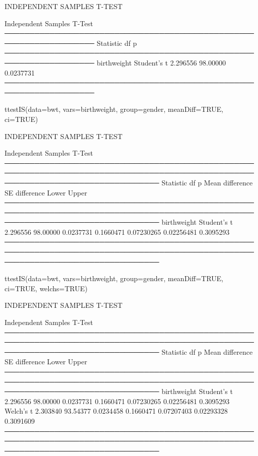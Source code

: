 \documentclass[
]{memoir}
\newenvironment{Shaded}{\begin{snugshade}}{\end{snugshade}}
\newcommand{\AttributeTok}[1]{\textcolor[rgb]{0.77,0.63,0.00}{#1}}
\newcommand{\ConstantTok}[1]{\textcolor[rgb]{0.00,0.00,0.00}{#1}}
\newcommand{\FunctionTok}[1]{\textcolor[rgb]{0.00,0.00,0.00}{#1}}
\newcommand{\NormalTok}[1]{#1}
\begin{document}
INDEPENDENT SAMPLES T-TEST

Independent Samples T-Test\\
────────────────────────────────────────────────────────────────────
Statistic df p\\
────────────────────────────────────────────────────────────────────
birthweight Student's t 2.296556 98.00000 0.0237731\\
────────────────────────────────────────────────────────────────────

\begin{Shaded}
\begin{Highlighting}[]
\FunctionTok{ttestIS}\NormalTok{(}\AttributeTok{data=}\NormalTok{bwt, }\AttributeTok{vars=}\NormalTok{birthweight, }\AttributeTok{group=}\NormalTok{gender, }\AttributeTok{meanDiff=}\ConstantTok{TRUE}\NormalTok{, }\AttributeTok{ci=}\ConstantTok{TRUE}\NormalTok{)}
\end{Highlighting}
\end{Shaded}

INDEPENDENT SAMPLES T-TEST

Independent Samples T-Test\\
───────────────────────────────────────────────────────────────────────────────────────────────────────────────────────────────────
Statistic df p Mean difference SE difference Lower Upper\\
───────────────────────────────────────────────────────────────────────────────────────────────────────────────────────────────────
birthweight Student's t 2.296556 98.00000 0.0237731 0.1660471 0.07230265 0.02256481 0.3095293\\
───────────────────────────────────────────────────────────────────────────────────────────────────────────────────────────────────

\begin{Shaded}
\begin{Highlighting}[]
\FunctionTok{ttestIS}\NormalTok{(}\AttributeTok{data=}\NormalTok{bwt, }\AttributeTok{vars=}\NormalTok{birthweight, }\AttributeTok{group=}\NormalTok{gender, }\AttributeTok{meanDiff=}\ConstantTok{TRUE}\NormalTok{, }\AttributeTok{ci=}\ConstantTok{TRUE}\NormalTok{, }\AttributeTok{welchs=}\ConstantTok{TRUE}\NormalTok{)}
\end{Highlighting}
\end{Shaded}

INDEPENDENT SAMPLES T-TEST

Independent Samples T-Test\\
───────────────────────────────────────────────────────────────────────────────────────────────────────────────────────────────────
Statistic df p Mean difference SE difference Lower Upper\\
───────────────────────────────────────────────────────────────────────────────────────────────────────────────────────────────────
birthweight Student's t 2.296556 98.00000 0.0237731 0.1660471 0.07230265 0.02256481 0.3095293\\
Welch's t 2.303840 93.54377 0.0234458 0.1660471 0.07207403 0.02293328 0.3091609\\
───────────────────────────────────────────────────────────────────────────────────────────────────────────────────────────────────
\end{document}
